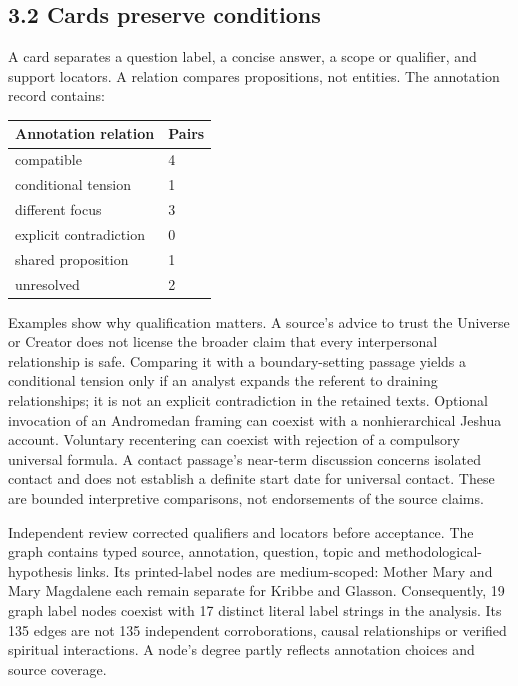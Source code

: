 \documentclass[
  10pt,
]{article}
\begin{document}
\subsection{3.2 Cards preserve
conditions}\label{cards-preserve-conditions}

A card separates a question label, a concise answer, a scope or
qualifier, and support locators. A relation compares propositions, not
entities. The annotation record contains:

\begin{longtable}[]{@{}ll@{}}
\toprule\noalign{}
Annotation relation & Pairs \\
\midrule\noalign{}
\endhead
\bottomrule\noalign{}
\endlastfoot
compatible & 4 \\
conditional tension & 1 \\
different focus & 3 \\
explicit contradiction & 0 \\
shared proposition & 1 \\
unresolved & 2 \\
\end{longtable}

Examples show why qualification matters. A source's advice to trust the
Universe or Creator does not license the broader claim that every
interpersonal relationship is safe. Comparing it with a boundary-setting
passage yields a conditional tension only if an analyst expands the
referent to draining relationships; it is not an explicit contradiction
in the retained texts. Optional invocation of an Andromedan framing can
coexist with a nonhierarchical Jeshua account. Voluntary recentering can
coexist with rejection of a compulsory universal formula. A contact
passage's near-term discussion concerns isolated contact and does not
establish a definite start date for universal contact. These are bounded
interpretive comparisons, not endorsements of the source claims.

Independent review corrected qualifiers and locators before acceptance.
The graph contains typed source, annotation, question, topic and
methodological-hypothesis links. Its printed-label nodes are
medium-scoped: Mother Mary and Mary Magdalene each remain separate for
Kribbe and Glasson. Consequently, 19 graph label nodes coexist with 17
distinct literal label strings in the analysis. Its 135 edges are not
135 independent corroborations, causal relationships or verified
spiritual interactions. A node's degree partly reflects annotation
choices and source coverage.
\end{document}
